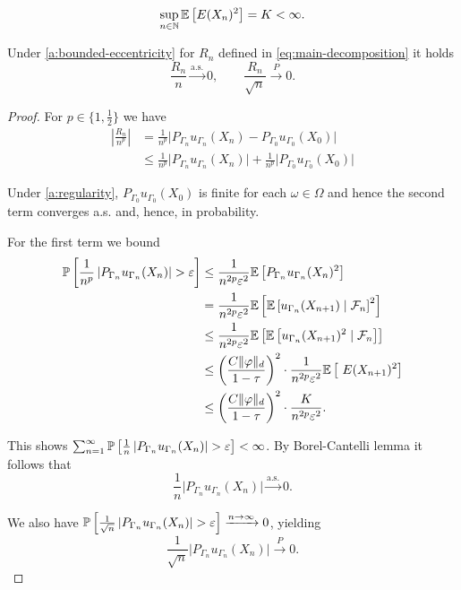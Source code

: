 \begin{assumption}
\label{a:bounded-eccentricity}
    \[
    \sup_{n \in \mathbb{N}} \mathbb{E} \left[ E(X_n)^2 \right] = K < \infty.
    \]
\end{assumption}
\begin{lemma}
    Under \ref{a:bounded-eccentricity} for $R_n$ defined in \eqref{eq:main-decomposition} it holds
\[
    \frac{R_n}{n} \xrightarrow{\text{a.s.}} 0, \qquad \frac{R_n}{\sqrt{n}} \xrightarrow{P} 0.
\]
\begin{proof}
    For $p \in \{1, \frac{1}{2}\}$ we have
    \begin{align*}
        \left\vert\frac{R_n}{n^p}\right\vert
        &=\frac{1}{n^p}\big|P_{\Gamma_{n}}u_{\Gamma_{n}}(X_{n})- P_{\Gamma_0}u_{\Gamma_0}(X_0)\big| \\
        &\leq \frac{1}{n^p}\big|P_{\Gamma_{n}}u_{\Gamma_{n}}(X_{n})\big| + 
        \frac{1}{n^p}\big| P_{\Gamma_0}u_{\Gamma_0}(X_0)\big| 
    \end{align*}

Under \ref{a:regularity}, $P_{\Gamma_0}u_{\Gamma_0}(X_0)$ is finite for each $\omega \in \Omega $ and hence the second term converges a.s. and, hence, in probability.

For the first term we bound
\begin{align*}
    \mathbb{P} \left[ \frac{1}{n^p} \left\vert P_{\Gamma_n}u_{\Gamma_n}(X_n) \right\vert > \varepsilon \right]
    &\leq \frac{1}{n^{2p} \varepsilon^2} \mathbb{E} \left[ P_{\Gamma_n}u_{\Gamma_n}(X_n)^2 \right] \\
    &= \frac{1}{n^{2p} \varepsilon^2} \mathbb{E} \left[ \mathbb{E} \left[  u_{\Gamma_n}(X_{n+1}) \mid \mathcal{F}_n  \right]^2 \right] \\
    &\leq \frac{1}{n^{2p} \varepsilon^2} \mathbb{E} \left[ \mathbb{E} \left[  u_{\Gamma_n}(X_{n+1})^2 \mid \mathcal{F}_n  \right] \right] \\
    &\leq \left( \frac{C \| \varphi \|_d}{1 - \tau} \right)^2 \cdot \frac{1}{n^{2p} \varepsilon^2} \mathbb{E} \left[ \ E(X_{n+1})^2  \right] \\
    &\leq \left( \frac{C \| \varphi \|_d}{1 - \tau} \right)^2 \cdot \frac{K}{n^{2p} \varepsilon^2} .
\end{align*}

    This shows $\sum_{n=1}^{\infty}  \mathbb{P} \left[ \frac{1}{n} \left\vert P_{\Gamma_n}u_{\Gamma_n}(X_n) \right\vert > \varepsilon \right] < \infty$. By Borel-Cantelli lemma it follows that 
  \[
  \frac{1}{n}\big|P_{\Gamma_{n}}u_{\Gamma_{n}}(X_{n})\big| \xrightarrow{\text{a.s.}} 0.
  \]

  We also have $\mathbb{P} \left[ \frac{1}{\sqrt{n}} \left\vert P_{\Gamma_n}u_{\Gamma_n}(X_n) \right\vert > \varepsilon \right]\xrightarrow{n \to \infty} 0$, yielding
  \[
  \frac{1}{\sqrt{n}}\big|P_{\Gamma_{n}}u_{\Gamma_{n}}(X_{n})\big| \xrightarrow{P} 0.
  \]


\end{proof}
\end{lemma}
